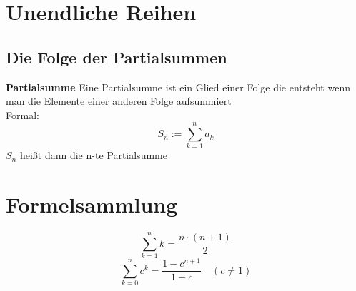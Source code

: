 \documentclass[12pt,a4paper]{article}
\begin{document}
\section{Unendliche Reihen}
\subsection{Die Folge der Partialsummen}
\textbf{Partialsumme}
Eine Partialsumme ist ein Glied einer Folge die entsteht wenn man die Elemente einer anderen Folge aufsummiert\\
Formal: \[S_n :=\sum_{k=1}^{n}a_k\]
$S_n$ heißt dann die n-te Partialsumme

\pagebreak

\section{Formelsammlung}
\[\sum_{k=1}^nk=\frac{n\cdot(n+1)}{2}\]
\[\sum_{k=0}^nc^k=\frac{1-c^{n+1}}{1-c}\quad(c\neq 1)\]
\end{document}
